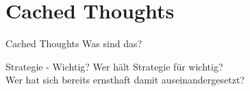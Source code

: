 

\section{Cached Thoughts}

\begin{frame}[c]{Cached Thoughts}
    \Large
    Was sind das?
\end{frame}






\begin{frame}[c]{Strategie - Wichtig?}
    \Large
    Wer hält Strategie für wichtig? \\ \pause
    Wer hat sich bereits ernsthaft damit auseinandergesetzt?
\end{frame}


